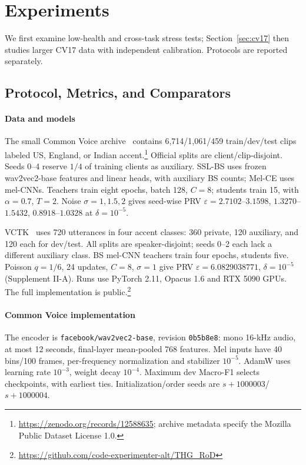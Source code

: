 \section{Experiments}
\label{sec:experiments}
We first examine low-health and cross-task stress tests; Section~\ref{sec:cv17} then studies larger CV17 data with independent calibration. Protocols are reported separately.

\subsection{Protocol, Metrics, and Comparators}
\label{sec:exp_setup}
\paragraph*{Data and models}
The small Common Voice archive~\cite{ardila2020commonvoice} contains 6,714/1,061/459 train/dev/test clips labeled US, England, or Indian accent.\footnote{\url{https://zenodo.org/records/12588635}; archive metadata specify the Mozilla Public Dataset License 1.0.} Official splits are client/clip-disjoint. Seeds 0--4 reserve $1/4$ of training clients as auxiliary. SSL-BS uses frozen wav2vec2-base features and linear heads, with auxiliary BS counts; Mel-CE uses mel-CNNs. Teachers train eight epochs, batch 128, $C=8$; students train 15, with $\alpha=0.7$, $T=2$. Noise $\sigma=1,1.5,2$ gives seed-wise PRV $\varepsilon=2.7102$--$3.1598$, $1.3270$--$1.5432$, $0.8918$--$1.0328$ at $\delta=10^{-5}$.

VCTK~\cite{veaux2017vctk} uses 720 utterances in four accent classes: 360 private, 120 auxiliary, and 120 each for dev/test. All splits are speaker-disjoint; seeds 0--2 each lack a different auxiliary class. BS mel-CNN teachers train four epochs, students five. Poisson $q=1/6$, 24 updates, $C=8$, $\sigma=1$ give PRV $\varepsilon=6.0829038771$, $\delta=10^{-5}$ (Supplement II-A). Runs use PyTorch 2.11, Opacus 1.6 and RTX 5090 GPUs. The full implementation is public.\footnote{\url{https://github.com/code-experimenter-alt/THG_RoD}}

\paragraph*{Common Voice implementation}
The encoder is \texttt{facebook/wav2vec2-base}, revision \texttt{0b5b8e8}: mono 16-kHz audio, at most 12 seconds, final-layer mean-pooled 768 features. Mel inputs have 40 bins/100 frames, per-frequency normalization and stabilizer $10^{-5}$. AdamW uses learning rate $10^{-3}$, weight decay $10^{-4}$. Maximum dev Macro-F1 selects checkpoints, with earliest ties. Initialization/order seeds are $s+1000003$/$s+1000004$.

